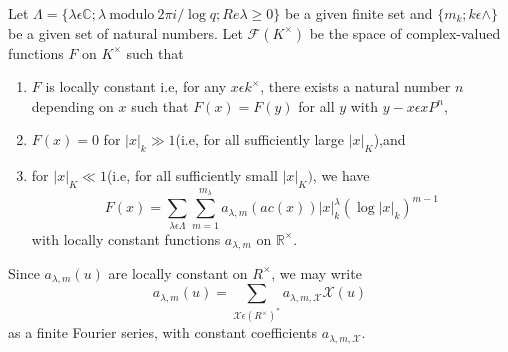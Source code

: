 Let $\Lambda=\{\lambda \epsilon \mathbb{C}; \lambda ~\text{modulo}~ 2\pi
  i/\log q; Re\lambda \ge 0\}$ be a given finite set and
  $\{m_{k};k \epsilon \wedge\}$ be a given set of natural numbers. Let
$\mathscr{F}(K^{\times})$ be the space of complex-valued functions $F$ on
$K^{\times}$ such that 
\begin{enumerate}
\renewcommand{\theenumi}{\roman{enumi}}
\renewcommand{\labelenumi}{(\theenumi)}
\item $F$ is locally constant i.e, for any $x\epsilon k^{\times}$, there
  exists a natural number $n$ depending on $x$ such that $F(x)=F(y)$
  for all $y$ with $y-x\epsilon xP^{n}$,
\item $F(x)=0$ for $|x|_{k}\gg 1$(i.e, for all sufficiently large
  $|x|_{K}$),and 
\item for $|x|_{K} \ll 1$(i.e, for all sufficiently small $|x|_{K})$,
  we have
\begin{equation*}
  F(x)=\sum\limits_{\lambda \epsilon
    \Lambda}\sum\limits_{m=1}^{m_{\lambda}}a_{\lambda,m}(ac(x))|x|_{k}^{\lambda}(\log
  |x|_{k})^{m-1}\tag{29}\label{chap1:sec5:subsec2:eq29} 
\end{equation*}
with locally constant functions $a_{\lambda,m}$ on $\mathbb{R^{\times}}$.
\end{enumerate}

Since $a_{\lambda,m}(u)$ are locally constant on $R^{\times}$, we may
write 
\begin{equation*}
  a_{\lambda,m}(u)=\sum\limits_{\mathcal{X} \epsilon
    (R^{\times})^{\ast}}a_{\lambda,m,\mathcal{X}}\mathcal{X}(u)
  \tag{30}\label{chap1:sec5:subsec2:eq30}  
\end{equation*}
as a finite Fourier series, with constant coefficients
$a_{\lambda,m,\mathcal{X}}$.

